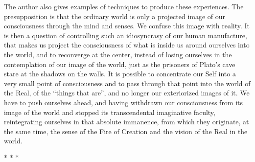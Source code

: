 The author also gives examples of techniques to produce these experiences. The presupposition is that the ordinary world is only a projected image of our consciousness through the mind and senses. We confuse this image with reality. It is then a question of controlling such an idiosyncrasy of our human manufacture, that makes us project the consciousness of what is inside us around ourselves into the world, and to reconverge at the center, instead of losing ourselves in the contemplation of our image of the world, just as the prisoners of Plato's cave stare at the shadows on the walls. It is possible to concentrate our Self into a very small point of consciousness and to pass through that point into the world of the Real, of the ``things that are'', and no longer our exteriorized images of it. We have to push ourselves ahead, and having withdrawn our consciousness from its image of the world and stopped its transcendental imaginative faculty, reintegrating ourselves in that absolute immanence, from which they originate, at the same time, the sense of the Fire of Creation and the vision of the Real in the world.



\begin{center}* * *\end{center}

